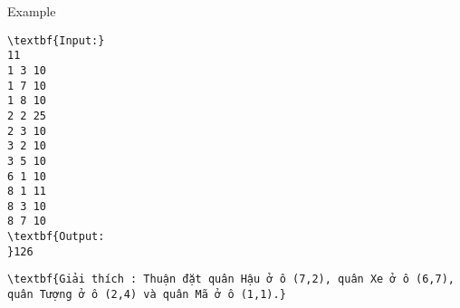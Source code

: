 Example
\begin{verbatim}
\textbf{Input:}
11
1 3 10
1 7 10
1 8 10
2 2 25
2 3 10
3 2 10
3 5 10
6 1 10
8 1 11
8 3 10
8 7 10
\textbf{Output:
}126\end{verbatim}
\begin{verbatim}
\textbf{Giải thích : Thuận đặt quân Hậu ở ô (7,2), quân Xe ở ô (6,7), quân Tượng ở ô (2,4) và quân Mã ở ô (1,1).}\end{verbatim}